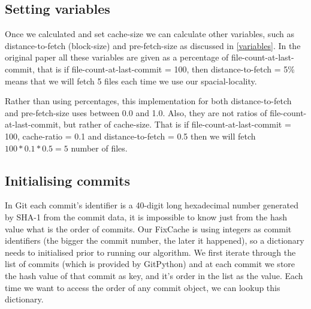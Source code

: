 \documentclass[12pt,twoside,notitlepage]{report}
\newcommand{\fxch}{FixCache}
\begin{document}
\subsection{Setting variables} Once we calculated and set cache-size we can calculate other variables, such as distance-to-fetch (block-size) and pre-fetch-size as discussed in \ref{variables}. In the original paper all these variables are given as a percentage of file-count-at-last-commit, that is if file-count-at-last-commit = 100, then distance-to-fetch = 5\% means that we will fetch 5 files each time we use our spacial-locality.

Rather than using percentages, this implementation for both distance-to-fetch and pre-fetch-size uses between 0.0 and 1.0. Also, they are not ratios of file-count-at-last-commit, but rather of cache-size. That is if file-count-at-last-commit = 100, cache-ratio = 0.1 and distance-to-fetch = 0.5 then we will fetch $100*0.1*0.5 = 5$ number of files.

\subsection{Initialising commits} In Git each commit's identifier is a 40-digit long hexadecimal number generated by SHA-1 from the commit data, it is impossible to know just from the hash value what is the order of commits. Our \fxch{} is using integers as commit identifiers (the bigger the commit number, the later it happened), so a dictionary needs to initialised prior to running our algorithm. We first iterate through the list of commits (which is provided by GitPython) and at each commit we store the hash value of that commit as key, and it's order in the list as the value. Each time we want to access the order of any commit object, we can lookup this dictionary.
\clearpage
\end{document}

